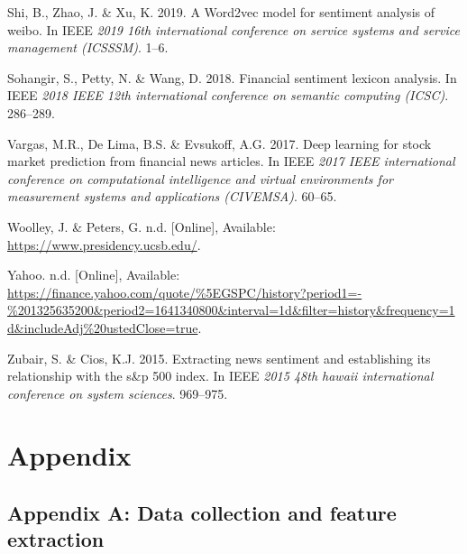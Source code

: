 \documentclass[11pt,preprint, authoryear]{elsarticle}
\numberwithin{equation}{section}
\numberwithin{figure}{section}
\numberwithin{table}{section}
\newlength{\cslhangindent}
\newenvironment{CSLReferences}%
  {\setlength{\parindent}{0pt}%
  \everypar{\setlength{\hangindent}{\cslhangindent}}\ignorespaces}%
  {\par}
\begin{document}
\begin{CSLReferences}{1}{0}
\leavevmode{}%
Shi, B., Zhao, J. \& Xu, K. 2019. A Word2vec model for sentiment
analysis of weibo. In IEEE \emph{2019 16th international conference on
service systems and service management (ICSSSM)}. 1--6.

\leavevmode{}%
Sohangir, S., Petty, N. \& Wang, D. 2018. Financial sentiment lexicon
analysis. In IEEE \emph{2018 IEEE 12th international conference on
semantic computing (ICSC)}. 286--289.

\leavevmode{}%
Vargas, M.R., De Lima, B.S. \& Evsukoff, A.G. 2017. Deep learning for
stock market prediction from financial news articles. In IEEE \emph{2017
IEEE international conference on computational intelligence and virtual
environments for measurement systems and applications (CIVEMSA)}.
60--65.

\leavevmode{}%
Woolley, J. \& Peters, G. n.d. {[}Online{]}, Available:
\url{https://www.presidency.ucsb.edu/}.

\leavevmode{}%
Yahoo. n.d. {[}Online{]}, Available:
\url{https://finance.yahoo.com/quote/\%5EGSPC/history?period1=-\%201325635200\&period2=1641340800\&interval=1d\&filter=history\&frequency=1d\&includeAdj\%20ustedClose=true}.

\leavevmode{}%
Zubair, S. \& Cios, K.J. 2015. Extracting news sentiment and
establishing its relationship with the s\&p 500 index. In IEEE
\emph{2015 48th hawaii international conference on system sciences}.
969--975.

\end{CSLReferences}

\hypertarget{appendix}{%
\section*{Appendix}\label{appendix}}

\hypertarget{appendix-a-data-collection-and-feature-extraction}{%
\subsection*{Appendix A: Data collection and feature
extraction}\label{appendix-a-data-collection-and-feature-extraction}}
\end{document}
